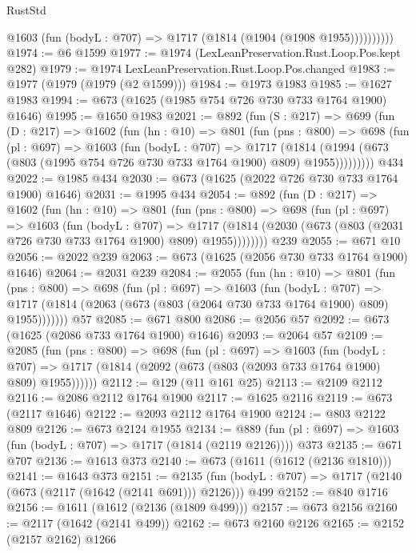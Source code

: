 \begin{lexlean}{RustStd}
\begin{coremodule}
              @1603 (fun (bodyL : @707) => @1717 (@1814 (@1904 (@1908 @1955))))))))))
@1974 := @6 @1599
@1977 := @1974 (LexLeanPreservation.Rust.Loop.Pos.kept @282)
@1979 := @1974 LexLeanPreservation.Rust.Loop.Pos.changed
@1983 := @1977 (@1979 (@1979 (@2 @1599)))
@1984 := @1973 @1983
@1985 := @1627 @1983
@1994 := @673 (@1625 (@1985 @754 @726 @730 @733 @1764 @1900) @1646)
@1995 := @1650 @1983
@2021 := @892
    (fun (S : @217) =>
    @699
      (fun (D : @217) =>
      @1602
        (fun (hn : @10) =>
        @801
          (fun (pns : @800) =>
          @698
            (fun (pl : @697) =>
            @1603
              (fun (bodyL : @707) =>
              @1717
                (@1814
                  (@1994 (@673 (@803 (@1995 @754 @726 @730 @733 @1764 @1900) @809) @1955)))))))))
    @434
@2022 := @1985 @434
@2030 := @673 (@1625 (@2022 @726 @730 @733 @1764 @1900) @1646)
@2031 := @1995 @434
@2054 := @892
    (fun (D : @217) =>
    @1602
      (fun (hn : @10) =>
      @801
        (fun (pns : @800) =>
        @698
          (fun (pl : @697) =>
          @1603
            (fun (bodyL : @707) =>
            @1717 (@1814 (@2030 (@673 (@803 (@2031 @726 @730 @733 @1764 @1900) @809) @1955))))))))
    @239
@2055 := @671 @10
@2056 := @2022 @239
@2063 := @673 (@1625 (@2056 @730 @733 @1764 @1900) @1646)
@2064 := @2031 @239
@2084 := @2055
    (fun (hn : @10) =>
    @801
      (fun (pns : @800) =>
      @698
        (fun (pl : @697) =>
        @1603
          (fun (bodyL : @707) =>
          @1717 (@1814 (@2063 (@673 (@803 (@2064 @730 @733 @1764 @1900) @809) @1955)))))))
    @57
@2085 := @671 @800
@2086 := @2056 @57
@2092 := @673 (@1625 (@2086 @733 @1764 @1900) @1646)
@2093 := @2064 @57
@2109 := @2085
    (fun (pns : @800) =>
    @698
      (fun (pl : @697) =>
      @1603
        (fun (bodyL : @707) =>
        @1717 (@1814 (@2092 (@673 (@803 (@2093 @733 @1764 @1900) @809) @1955))))))
@2112 := @129 (@11 @161 @25)
@2113 := @2109 @2112
@2116 := @2086 @2112 @1764 @1900
@2117 := @1625 @2116
@2119 := @673 (@2117 @1646)
@2122 := @2093 @2112 @1764 @1900
@2124 := @803 @2122 @809
@2126 := @673 @2124 @1955
@2134 := @889 (fun (pl : @697) => @1603 (fun (bodyL : @707) => @1717 (@1814 (@2119 @2126)))) @373
@2135 := @671 @707
@2136 := @1613 @373
@2140 := @673 (@1611 (@1612 (@2136 @1810)))
@2141 := @1643 @373
@2151 := @2135 (fun (bodyL : @707) => @1717 (@2140 (@673 (@2117 (@1642 (@2141 @691))) @2126))) @499
@2152 := @840 @1716
@2156 := @1611 (@1612 (@2136 (@1809 @499)))
@2157 := @673 @2156
@2160 := @2117 (@1642 (@2141 @499))
@2162 := @673 @2160 @2126
@2165 := @2152 (@2157 @2162) @1266

\end{coremodule}
\end{lexlean}
